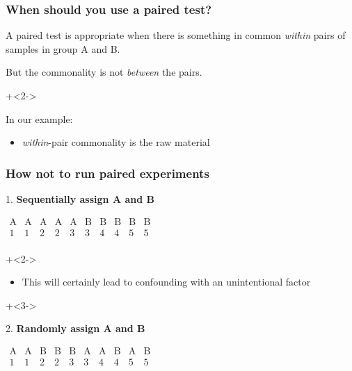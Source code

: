 \begin{frame}\frametitle{When should you use a paired test?}

	\begin{exampleblock}{}
			A paired test is appropriate when there is something in common {\color{red}\emph{within}} pairs of samples in group A and B.
			
			\vspace{12pt}
			But the commonality is not {\color{red}\emph{between}} the pairs.
	\end{exampleblock}
	

	\onslide+<2->{
		\vspace{12pt}
		In our example:
		\begin{itemize}
			\item	{\color{red}\emph{within}}-pair commonality is the raw material
		\end{itemize}
	}

\end{frame}

\begin{frame}\frametitle{How \textbf{not} to run paired experiments}

	1. \textbf{Sequentially assign A and B} {\color{myOrange}{(don't ever do this!)}}

	\vspace{12pt}
	$
	\begin{array}{cccccccccc}
		\text{A} & \text{A} & \text{A} & \text{A} & \text{A} & \text{B} & \text{B} & \text{B} & \text{B} & \text{B} \\
		1 & 1 & 2 & 2 & 3 & 3 & 4 & 4 & 5 & 5\\
	\end{array}
	$
	
	\onslide+<2->{
		\begin{itemize}
			\item	{\color{myGreen}This will certainly lead to confounding with an unintentional factor}
		\end{itemize}
	}

	\vspace{24pt}
	
	\onslide+<3->{
		2. \textbf{Randomly assign A and B} {\color{myOrange}{(commonality between pairs won't cancel)}}

		\vspace{12pt}
		$
		\begin{array}{cccccccccc}
			\text{A} & \text{A} & \text{B} & \text{B} & \text{B} & \text{A} & \text{A} & \text{B} & \text{A} & \text{B} \\
			1 & 1 & 2 & 2 & 3 & 3 & 4 & 4 & 5 & 5\\
		\end{array}
		$
	}
\end{frame}

